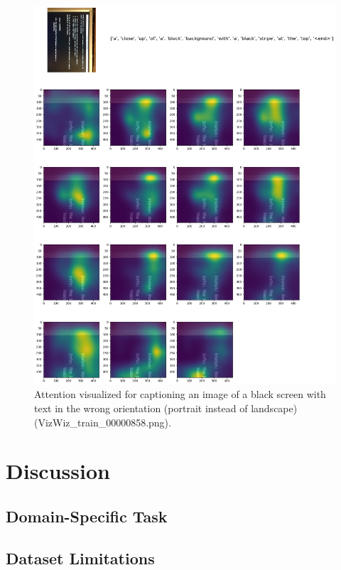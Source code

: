 \documentclass[11pt,a4paper]{article}
\begin{document}
\begin{figure}[ht]
  \includegraphics[width=\linewidth]{VizWiz_train_00000858.png}
  \caption{Attention visualized for captioning an image of a black screen with text in the wrong orientation (portrait instead of landscape)(VizWiz\_train\_00000858.png).}
  \label{fig:blackscreen}
\end{figure}

\section{Discussion}
\label{sec:discussion}
\subsection{Domain-Specific Task}
\label{ssec:dstask}

\subsection{Dataset Limitations}
\label{ssec:datasetlimitations}
\end{document}
